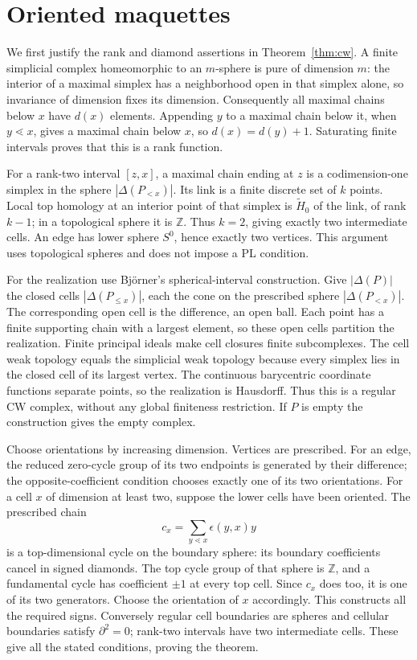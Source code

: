 \documentclass[11pt,a4paper]{article}
\theoremstyle{definition}
\newcommand{\Z}{\mathbb Z}
\begin{document}
\section{Oriented maquettes}
We first justify the rank and diamond assertions in
Theorem~\ref{thm:cw}. A finite simplicial complex homeomorphic
 to an $m$-sphere is pure of dimension $m$: the interior of a
maximal simplex has a neighborhood open in that simplex alone,
so invariance of dimension fixes its dimension. Consequently
all maximal chains below $x$ have $d(x)$ elements. Appending
$y$ to a maximal chain below it, when $y\lessdot x$, gives a
maximal chain below $x$, so $d(x)=d(y)+1$. Saturating finite
intervals proves that this is a rank function.

For a rank-two interval $[z,x]$, a maximal chain ending at $z$
is a codimension-one simplex in the sphere $|\Delta(P_{<x})|$.
Its link is a finite discrete set of $k$ points. Local top
homology at an interior point of that simplex is
$\widetilde H_0$ of the link, of rank $k-1$; in a topological
sphere it is $\Z$. Thus $k=2$, giving exactly two intermediate
cells. An edge has lower sphere $S^0$, hence exactly two vertices.
This argument uses topological spheres and does not impose a PL
condition.

For the realization use Bj\"orner's spherical-interval construction. Give $|\Delta(P)|$ the closed cells $|\Delta(P_{\le x})|$, each the cone on the prescribed sphere $|\Delta(P_{<x})|$. The corresponding open cell is the difference, an open ball. Each point has a finite supporting chain with a largest element, so these open cells partition the realization. Finite principal ideals make cell closures finite subcomplexes. The cell weak topology equals the simplicial weak topology because every simplex lies in the closed cell of its largest vertex. The continuous barycentric coordinate functions separate points, so the realization is Hausdorff. Thus this is a regular CW complex, without any global finiteness restriction. If $P$ is empty the construction gives the empty complex.

Choose orientations by increasing dimension. Vertices are prescribed. For an edge, the reduced zero-cycle group of its two endpoints is generated by their difference; the opposite-coefficient condition chooses exactly one of its two orientations. For a cell $x$ of dimension at least two, suppose the lower cells have been oriented. The prescribed chain
\[
 c_x=\sum_{y\lessdot x}\epsilon(y,x)y
\]
is a top-dimensional cycle on the boundary sphere: its boundary coefficients cancel in signed diamonds. The top cycle group of that sphere is $\Z$, and a fundamental cycle has coefficient $\pm1$ at every top cell. Since $c_x$ does too, it is one of its two generators. Choose the orientation of $x$ accordingly. This constructs all the required signs. Conversely regular cell boundaries are spheres and cellular boundaries satisfy $\partial^2=0$; rank-two intervals have two intermediate cells. These give all the stated conditions, proving the theorem.
\end{document}
